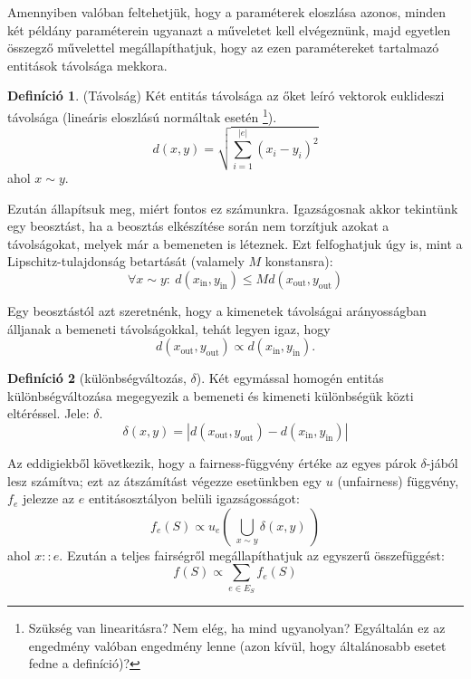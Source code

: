 \documentclass[twocolumn]{article}
\theoremstyle{definition}
\newtheorem{definition}{Definíció}[section]
\newcommand{\subin}[1]{ {#1}_{\text{in}} }
\newcommand{\subout}[1]{ {#1}_{\text{out}} }
\begin{document}
    Amennyiben valóban feltehetjük, hogy a paraméterek eloszlása azonos, minden két példány paraméterein ugyanazt a műveletet kell elvégeznünk, majd egyetlen összegző művelettel megállapíthatjuk, hogy az ezen paramétereket tartalmazó entitások távolsága mekkora. 
    
    \begin{definition} (Távolság) \label{def:tavolsag}
        Két entitás távolsága az őket leíró vektorok euklideszi távolsága (lineáris eloszlású normáltak esetén \footnote{Szükség van linearitásra? Nem elég, ha mind ugyanolyan? Egyáltalán ez az engedmény valóban engedmény lenne (azon kívül, hogy általánosabb esetet fedne a definíció)?}).
        \begin{equation}
            d(x, y) = \sqrt{\sum_{i=1}^{|e|} (x_i - y_i)^2 } 
        \end{equation}
        ahol $x \sim y$.
    \end{definition}
    
    Ezután állapítsuk meg, miért fontos ez számunkra. Igazságosnak akkor tekintünk egy beosztást, ha a beosztás elkészítése során nem torzítjuk azokat a távolságokat, melyek már a bemeneten is léteznek. Ezt felfoghatjuk úgy is, mint a Lipschitz-tulajdonság betartását (valamely $M$ konstansra):
    \begin{equation}
        \forall x \sim y : \ d(\subin{x}, \subin{y}) \leq Md(\subout{x}, \subout{y})
    \end{equation}
    
    Egy beosztástól azt szeretnénk, hogy a kimenetek távolságai arányosságban álljanak a bemeneti távolságokkal, tehát legyen igaz, hogy
    \begin{equation}
        d(\subout x, \subout y) \propto d(\subin x, \subin y).
    \end{equation}
    
    \begin{definition}[különbségváltozás, $\delta$]
        Két egymással homogén entitás különbségváltozása megegyezik a bemeneti és kimeneti különbségük közti eltéréssel. Jele: $\delta$.
        \begin{equation}
            \delta(x, y) = |d(\subout x, \subout y) - d(\subin x, \subin y)|
        \end{equation}
    \end{definition}

    Az eddigiekből következik, hogy a fairness-függvény értéke az egyes párok $\delta$-jából lesz számítva; ezt az átszámítást végezze esetünkben egy $u$ (unfairness) függvény, $f_e$ jelezze az $e$ entitásosztályon belüli igazságosságot:
    \begin{equation}
        f_e(S) \propto u_e\left(\ \bigcup_{x \sim y} \delta(x, y)\ \right)
    \end{equation}
    ahol $x::e$. Ezután a teljes fairségről megállapíthatjuk az egyszerű összefüggést:
    \begin{equation}
        f(S) \propto \sum_{e \in E_S} f_e(S)
    \end{equation}
    
\end{document}
